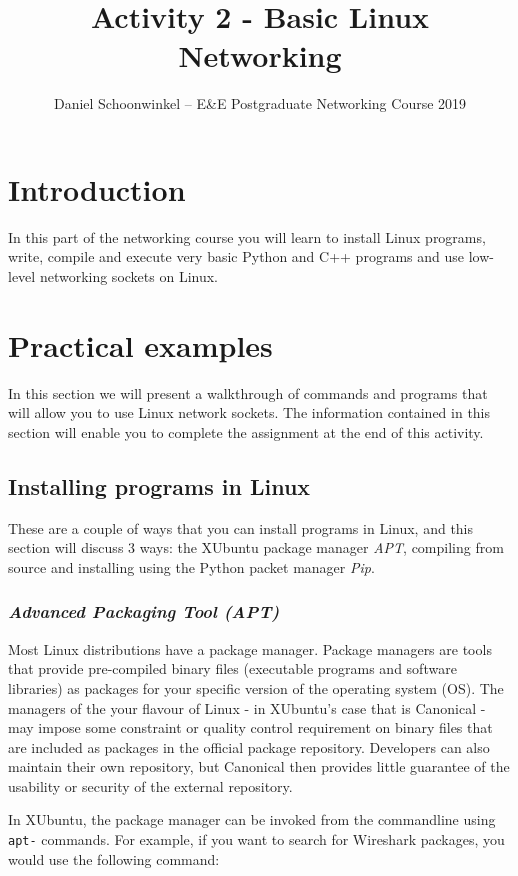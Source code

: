 \documentclass[a4paper]{article}
\title{Activity 2 - Basic Linux Networking}
\author{Daniel Schoonwinkel -- E\&E Postgraduate Networking Course 2019}
\begin{document}
\maketitle

\section{Introduction}

In this part of the networking course you will learn to install Linux programs, write, compile and execute very basic Python and C++ programs and use low-level networking sockets on Linux. 

\section{Practical examples}
In this section we will present a walkthrough of commands and programs that will allow you to use Linux network sockets. The information contained in this section will enable you to complete the assignment at the end of this activity. 

\subsection{Installing programs in Linux}

These are a couple of ways that you can install programs in Linux, and this section will discuss 3 ways: the XUbuntu package manager \emph{APT}, compiling from source and installing using the Python packet manager \emph{Pip}. 

\subsubsection{\emph{Advanced Packaging Tool (APT)} }

Most Linux distributions have a package manager. Package managers are tools that provide pre-compiled binary files (executable programs and software libraries) as packages for your specific version of the operating system (OS). The managers of the your flavour of Linux - in XUbuntu's case that is Canonical - may impose some constraint or quality control requirement on binary files that are included as packages in the official package repository. Developers can also maintain their own repository, but Canonical then provides little guarantee of the usability or security of the external repository.

In XUbuntu, the package manager can be invoked from the commandline using \texttt{apt-} commands. For example, if you want to search for Wireshark packages, you would use the following command:
\end{document}

